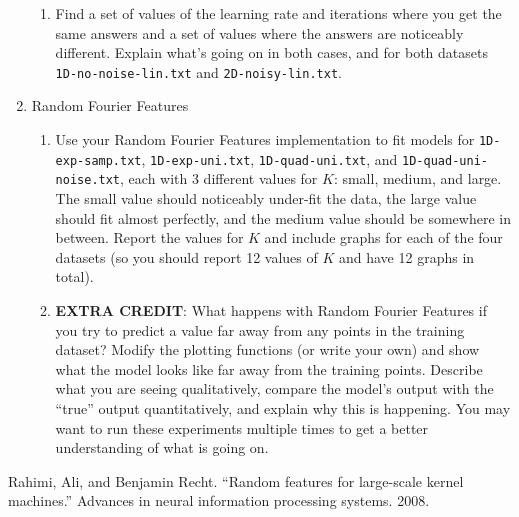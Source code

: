 \documentclass{article} %
\begin{document}
\begin{enumerate}
\begin{enumerate}
		\item Find a set of values of the learning rate and iterations where you get the same answers and a set of values 
		where the answers are noticeably different. Explain what's going on in both cases, and for both datasets \texttt{1D-no-noise-lin.txt} and \texttt{2D-noisy-lin.txt}.
	\end{enumerate}
	\item Random Fourier Features
	\begin{enumerate}
		\item Use your Random Fourier Features implementation to fit models for \texttt{1D-exp-samp.txt}, 
		\texttt{1D-exp-uni.txt}, \texttt{1D-quad-uni.txt}, and \texttt{1D-quad-uni-noise.txt}, each with 3 different values 
		for \(K\): small, medium, and large. The small value should noticeably under-fit the data, the large value should fit 
		almost perfectly, and the medium value should be somewhere in between. Report the values for \(K\) and include graphs 
		for each of the four datasets (so you should report 12 values of \(K\) and have 12 graphs in total).

		\item \textbf{EXTRA CREDIT}: What happens with Random Fourier Features if you try to predict a value far away from 
		any points in the training dataset? Modify the plotting functions (or write your own) and show what the model looks 
		like far away from the training points. Describe what you are seeing qualitatively, compare the model's output with 
		the ``true'' output quantitatively, and explain why this is happening. You may want to run these experiments multiple 
		times to get a better understanding of what is going on.
	\end{enumerate}
\end{enumerate}

\begin{thebibliography}{1}

 Rahimi, Ali, and Benjamin Recht. ``Random features for large-scale kernel 
machines.'' Advances in neural information processing systems. 2008.
\end{thebibliography}
\end{document}
